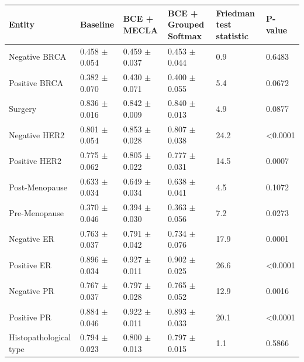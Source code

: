 \begin{tabular}{llllll}
\toprule
Entity & Baseline & BCE + MECLA & BCE + Grouped Softmax & Friedman test statistic & P-value \\
\midrule
Negative BRCA & 0.458 $\pm$ 0.054 & 0.459 $\pm$ 0.037 & 0.453 $\pm$ 0.044 & 0.9 & 0.6483 \\
Positive BRCA & 0.382 $\pm$ 0.070 & 0.430 $\pm$ 0.071 & 0.400 $\pm$ 0.055 & 5.4 & 0.0672 \\
Surgery & 0.836 $\pm$ 0.016 & 0.842 $\pm$ 0.009 & 0.840 $\pm$ 0.013 & 4.9 & 0.0877 \\
Negative HER2 & 0.801 $\pm$ 0.054 & 0.853 $\pm$ 0.028 & 0.807 $\pm$ 0.038 & 24.2 & <0.0001 \\
Positive HER2 & 0.775 $\pm$ 0.062 & 0.805 $\pm$ 0.022 & 0.777 $\pm$ 0.031 & 14.5 & 0.0007 \\
Post-Menopause & 0.633 $\pm$ 0.034 & 0.649 $\pm$ 0.034 & 0.638 $\pm$ 0.041 & 4.5 & 0.1072 \\
Pre-Menopause & 0.370 $\pm$ 0.046 & 0.394 $\pm$ 0.030 & 0.363 $\pm$ 0.056 & 7.2 & 0.0273 \\
Negative ER & 0.763 $\pm$ 0.037 & 0.791 $\pm$ 0.042 & 0.734 $\pm$ 0.076 & 17.9 & 0.0001 \\
Positive ER & 0.896 $\pm$ 0.034 & 0.927 $\pm$ 0.011 & 0.902 $\pm$ 0.025 & 26.6 & <0.0001 \\
Negative PR & 0.767 $\pm$ 0.037 & 0.797 $\pm$ 0.028 & 0.765 $\pm$ 0.052 & 12.9 & 0.0016 \\
Positive PR & 0.884 $\pm$ 0.046 & 0.922 $\pm$ 0.011 & 0.893 $\pm$ 0.033 & 20.1 & <0.0001 \\
Histopathological type & 0.794 $\pm$ 0.023 & 0.800 $\pm$ 0.013 & 0.797 $\pm$ 0.015 & 1.1 & 0.5866 \\
\bottomrule
\end{tabular}
